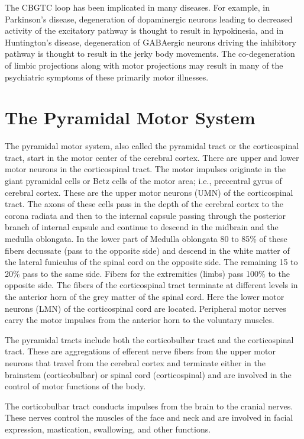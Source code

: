 \documentclass[]{book}
\begin{document}
The CBGTC loop has been implicated in many diseases. For example, in Parkinson's disease, degeneration of dopaminergic neurons leading to decreased activity of the excitatory pathway is thought to result in hypokinesia, and in Huntington's disease, degeneration of GABAergic neurons driving the inhibitory pathway is thought to result in the jerky body movements. The co-degeneration of limbic projections along with motor projections may result in many of the psychiatric symptoms of these primarily motor illnesses.

\hypertarget{the-pyramidal-motor-system}{%
\section{The Pyramidal Motor System}\label{the-pyramidal-motor-system}}

The pyramidal motor system, also called the pyramidal tract or the corticospinal tract, start in the motor center of the cerebral cortex. There are upper and lower motor neurons in the corticospinal tract. The motor impulses originate in the giant pyramidal cells or Betz cells of the motor area; i.e., precentral gyrus of cerebral cortex. These are the upper motor neurons (UMN) of the corticospinal tract. The axons of these cells pass in the depth of the cerebral cortex to the corona radiata and then to the internal capsule passing through the posterior branch of internal capsule and continue to descend in the midbrain and the medulla oblongata. In the lower part of Medulla oblongata 80 to 85\% of these fibers decussate (pass to the opposite side) and descend in the white matter of the lateral funiculus of the spinal cord on the opposite side. The remaining 15 to 20\% pass to the same side. Fibers for the extremities (limbs) pass 100\% to the opposite side. The fibers of the corticospinal tract terminate at different levels in the anterior horn of the grey matter of the spinal cord. Here the lower motor neurons (LMN) of the corticospinal cord are located. Peripheral motor nerves carry the motor impulses from the anterior horn to the voluntary muscles.

The pyramidal tracts include both the corticobulbar tract and the corticospinal tract. These are aggregations of efferent nerve fibers from the upper motor neurons that travel from the cerebral cortex and terminate either in the brainstem (corticobulbar) or spinal cord (corticospinal) and are involved in the control of motor functions of the body.

The corticobulbar tract conducts impulses from the brain to the cranial nerves. These nerves control the muscles of the face and neck and are involved in facial expression, mastication, swallowing, and other functions.
\end{document}
